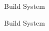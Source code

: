 \begin{frame}[fragile]

  {\Huge Build System}

  \vspace{10pt}

\end{frame}

\begin{frame}[fragile]{Build System}
\end{frame}
